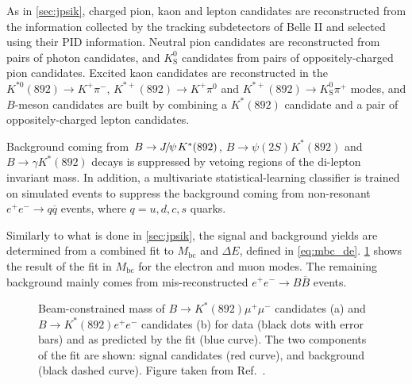 \documentclass{moriond}
\def\Mbc{\ensuremath{M_{\mathrm{bc}}}\xspace}
\def\dE{\ensuremath{\Delta E}\xspace}
\def\jpsi{\ensuremath{{J\mskip -3mu/\mskip -2mu\psi\mskip 2mu}}\xspace}
\def\epem{\ensuremath{e^+e^-}\xspace}
\def\Kp{\ensuremath{K^+}\xspace}
\def\KS{\ensuremath{K^0_{\mathrm{S}}}\xspace}
\def\Kstar{\ensuremath{K^{*}(892)}\xspace}
\def\Kstarz{\ensuremath{K^{*0}(892)}\xspace}
\def\Kstarp{\ensuremath{K^{*+}(892)}\xspace}
\def\BB{\ensuremath{B\overline{B}}\xspace}
\begin{document}
As in \cref{sec:jpsik}, charged pion, kaon and lepton candidates are reconstructed from the information collected by the tracking subdetectors of Belle II and selected using their PID information.
Neutral pion candidates are reconstructed from pairs of photon candidates, and $\KS$ candidates from pairs of oppositely-charged pion candidates.
Excited kaon candidates are reconstructed in the $\Kstarz\to\Kp\pi^-$, $\Kstarp\to\Kp\pi^0$ and $\Kstarp\to\KS\pi^+$ modes, and $B$-meson candidates are built by combining a \Kstar candidate and a pair of oppositely-charged lepton candidates.

Background coming from $B\to\jpsi\Kstar$, $B\to\psi(2S)\Kstar$ and $B\to\gamma\Kstar$ decays is suppressed by vetoing regions of the di-lepton invariant mass.
In addition, a multivariate statistical-learning classifier is trained on simulated events to suppress the background coming from non-resonant $\epem\to q\overline{q}$ events, where $q=u,d,c,s$ quarks.

Similarly to what is done in \cref{sec:jpsik}, the signal and background yields are determined from a combined fit to \Mbc and \dE, defined in \cref{eq:mbc_de}.
\cref{fig:kstarll} shows the result of the fit in \Mbc for the electron and muon modes.
The remaining background mainly comes from mis-reconstructed $\epem\to\BB$ events.

\begin{figure}[tb]
\centering
{}
\caption{Beam-constrained mass of $B \to K^{\ast}(892)\mu^+\mu^-$ candidates (a) and $B \to K^{\ast}(892)e^+e^-$ candidates (b) for data (black dots with error bars) and as predicted by the fit (blue curve).
The two components of the fit are shown: signal candidates (red curve), and background (black dashed curve).
Figure taken from Ref.~{\protect\cite{Belle-II:2022fky}}.}
\label{fig:kstarll}
\end{figure}
\end{document}

